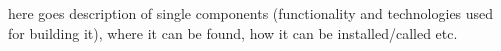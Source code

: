 here goes description of single components (functionality and
technologies used for building it), where it can be found, how
it can be installed/called etc.